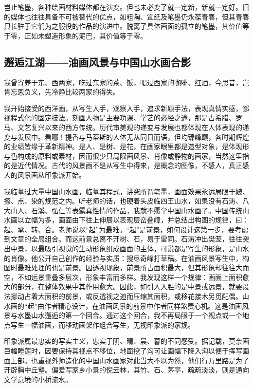 \documentclass{article}
\begin{document}
岂止笔墨，各种绘画材料媒体都在演变。但也未必变了就一定新，新就一定好。旧的媒体也往往具备不可被替代的优点，如粗陶、宣纸及笔墨仍永葆青春，但其青春只长驻于它们为之服役的作品的演进中。脱离了具体画面的孤立的笔墨，其价值等于零，正如未塑造形象的泥巴，其价值等于零。
\subsection{邂逅江湖——油画风景与中国山水画合影}
我曾寄养于东、西两家，吃过东家的茶、饭，喝过西家的咖啡、红酒，今思昔，岂肯忘恩负义，先冷静比较两家的得失。

我开始接受的西洋画，从写生入手，观察入手，追求新颖手法，表现真情实感，鄙视程式化的固定技法。刻画人物是主要功课、学艺的必经之途，那是古希腊、罗马、文艺复兴以来的西方传统。历代审美观的递变与发展也都体现在人体表现的递变与发展中。看哪！提香与马蒂斯的人体无从同日而语，但均臻峰巅，各时期辉煌的业绩皆缘于革新精神。是人、是树、是花，在画家眼里都是造型对象，是体现形与色构成的原料或素材，因而很少只局限画风景、肖像或静物的画家，当然这里指的是近代情况。古代的风景画不是从写生中得来，是概念的图像，不感人，真正感人的风景画从印象派开始。

我临摹过大量中国山水画，临摹其程式，讲究所谓笔墨，画面效果永远局限于皴、擦、点、染的规范之内。听老师的话，也硬着头皮临四王山水，如果没有石涛、八大山人、石溪、弘仁等表露真性情的作品，我就不愿学中国山水画了。中国传统山水画以立幅为多，画面由下往上伸展以表现层峦叠嶂，并总结出构图的规律，曰：起、承、转、合。老师说以“起”为最难。“起”是前景，如何设计这第一步，要考虑到文章的全局组合。而这前景总离不开树、石，易于雷同。石涛冲出樊笼，往往突出中景，以最吸引视觉的生动形象组成画面的主体，可说都是写生的形象，是山水的肖像。他公开自己创作的经验与实质：搜尽奇峰打草稿。在油画风景写生中，构图时最难处理的也是前景。因透视现象，前景所占面积最大，但其形象却往往大而空，不如远景重叠多层次，形象丰富而多样。我发现这样一个规律：画面上面积愈大的部分，在整体效果中其作用愈大。因此，如引人入胜的是中景或远景，就要设法挪动占着大面积的前景，或反透视之道而压缩其面积，或移花接木另觅配偶。山水画的“起”由作者精心设计，在油画风景的前景中作者同样煞费心机。这是油画风景与水墨山水邂逅的第一个回合。通过这个回合，我不再局限于一个视点或一个地点写生一幅油画，而移动画架作组合写生，无视印象派的家规。

印象派属最忠实的写实主义，忠实于阴、晴、晨、暮的不同感受。据记载，莫奈画巨幅睡莲时，因要保持其视点不移位，地面挖了沟可让画幅下降入沟以便于挥写画面上部。也重视外师造化的中国山水画家对此当大不以为然，他们行万里路是为了开辟胸中丘壑。偏爱写家乡小景的倪云林，其竹、石、茅亭，疏疏淡淡，则是通向文学意境的小桥流水。
\end{document}
